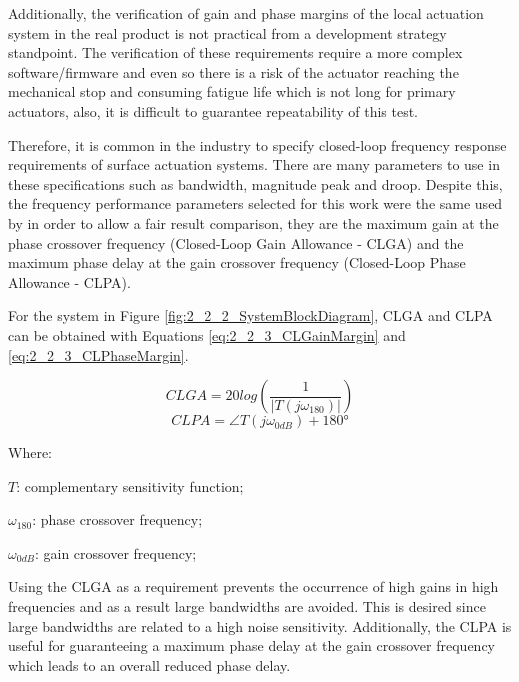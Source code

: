 Additionally, the verification of gain and phase margins of the local actuation system in the real product is not practical from a development strategy standpoint. The verification of these requirements require a more complex software/firmware and even so there is a risk of the actuator reaching the mechanical stop and consuming fatigue life which is not long for primary actuators, also, it is difficult to guarantee repeatability of this test.

Therefore, it is common in the industry to specify closed-loop frequency response requirements of surface actuation systems. There are many parameters to use in these specifications such as bandwidth, magnitude peak and droop. Despite this, the frequency performance parameters selected for this work were the same used by  in order to allow a fair result comparison, they are the maximum gain at the phase crossover frequency (Closed-Loop Gain Allowance - CLGA) and the maximum phase delay at the gain crossover frequency (Closed-Loop Phase Allowance - CLPA).

For the system in Figure \ref{fig:2_2_2_SystemBlockDiagram}, CLGA and CLPA can be obtained with Equations \ref{eq:2_2_3_CLGainMargin} and \ref{eq:2_2_3_CLPhaseMargin}.

\begin{equation}
\label{eq:2_2_3_CLGainMargin}
CLGA = 20log\left(\frac{1}{|T(j\omega_{180})|}\right)
\end{equation}
\begin{equation}
\label{eq:2_2_3_CLPhaseMargin}
CLPA = \angle T(j\omega_{0dB}) + 180°
\end{equation}

Where:

\begin{description}
	\item \hspace{20pt}$T$: complementary sensitivity function;
	\item \hspace{20pt}$\omega_{180}$: phase crossover frequency;
	\item \hspace{20pt}$\omega_{0dB}$: gain crossover frequency;
\end{description}

Using the CLGA as a requirement prevents the occurrence of high gains in high frequencies and as a result large bandwidths are avoided. This is desired since large bandwidths are related to a high noise sensitivity. Additionally, the CLPA is useful for guaranteeing a maximum phase delay at the gain crossover frequency which leads to an overall reduced phase delay.

